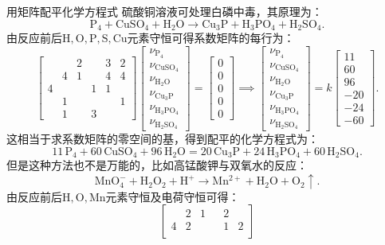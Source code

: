 \begin{example}
	{用矩阵配平化学方程式}{}
	硫酸铜溶液可处理白磷中毒，其原理为：
	\[
		\mathrm{P_4+CuSO_4+H_2O\to Cu_3P+H_3PO_4+H_2SO_4}.
	\]
	由反应前后$\mathrm{H,O,P,S,Cu}$元素守恒可得系数矩阵的每行为：
	\[
		\begin{bmatrix}
			&&2&&3&2\\
			&4&1&&4&4\\
			4&&&1&1\\
			&1&&&&1\\
			&1&&3
		\end{bmatrix}
		\begin{bmatrix}
			\nu_\mathrm{P_4}\\\nu_\mathrm{CuSO_4}\\\nu_\mathrm{H_2O}\\\nu_\mathrm{Cu_3P}\\\nu_\mathrm{H_3PO_4}\\\nu_\mathrm{H_2SO_4}
		\end{bmatrix}
		=
		\begin{bmatrix}
			0\\0\\0\\0\\0
		\end{bmatrix}
		\implies
		\begin{bmatrix}
			\nu_\mathrm{P_4}\\\nu_\mathrm{CuSO_4}\\\nu_\mathrm{H_2O}\\\nu_\mathrm{Cu_3P}\\\nu_\mathrm{H_3PO_4}\\\nu_\mathrm{H_2SO_4}
		\end{bmatrix}
		=k\begin{bmatrix}
			11\\60\\96\\-20\\-24\\-60
		\end{bmatrix}.
	\]
	这相当于求系数矩阵的零空间的基，得到配平的化学方程式为：
	\[
		\mathrm{11\,P_4+60\,CuSO_4+96\,H_2O=20\,Cu_3P+24\,H_3PO_4+60\,H_2SO_4}.
	\]
	\tcblower
	但是这种方法也不是万能的，比如高锰酸钾与双氧水的反应：
	\[
		\mathrm{MnO_4^-+H_2O_2+H^+\to Mn^{2+}+H_2O+O_2\uparrow}.
	\]
	由反应前后$\mathrm{H,O,Mn}$元素守恒及电荷守恒可得：
	\[
		\begin{bmatrix}
			&2&1&&2\\
			4&2&&&1&2\\

\end{bmatrix}\]
\end{example}
